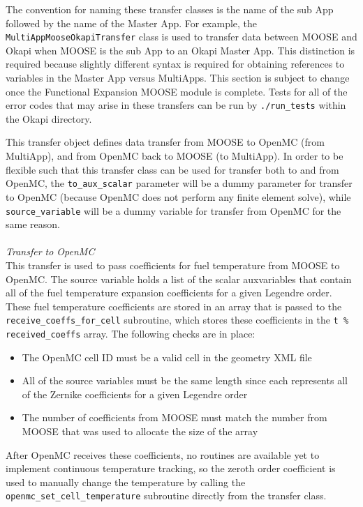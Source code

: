 \documentclass[10pt]{article}
\newcounter{subsubsubsection}[subsubsection]
\numberwithin{equation}{section} %
\begin{document}
The convention for naming these transfer classes is the name of the sub App followed by the name of the Master App. For example, the {\tt MultiAppMooseOkapiTransfer} class is used to transfer data between MOOSE and Okapi when MOOSE is the sub App to an Okapi Master App. This distinction is required because slightly different syntax is required for obtaining references to variables in the Master App versus MultiApps. This section is subject to change once the Functional Expansion MOOSE module is complete. Tests for all of the error codes that may arise in these transfers can be run by {\tt ./run\_tests} within the Okapi directory. 

This transfer object defines data transfer from MOOSE to OpenMC (from MultiApp), and from OpenMC back to MOOSE (to MultiApp). In order to be flexible such that this transfer class can be used for transfer both to and from OpenMC, the {\tt to\_aux\_scalar} parameter will be a dummy parameter for transfer to OpenMC (because OpenMC does not perform any finite element solve), while {\tt source\_variable} will be a dummy variable for transfer from OpenMC for the same reason.
\\\\
{\it Transfer to OpenMC}\\
This transfer is used to pass coefficients for fuel temperature from MOOSE to OpenMC. The source variable holds a list of the scalar auxvariables that contain all of the fuel temperature expansion coefficients for a given Legendre order. These fuel temperature coefficients are stored in an array that is passed to the {\tt receive\_coeffs\_for\_cell} subroutine, which stores these coefficients in the {\tt t \% received\_coeffs} array. The following checks are in place:

\begin{itemize}
\item The OpenMC cell ID must be a valid cell in the geometry XML file
\item All of the source variables must be the same length since each represents all of the Zernike coefficients for a given Legendre order
\item The number of coefficients from MOOSE must match the number from MOOSE that was used to allocate the size of the array
\end{itemize}

After OpenMC receives these coefficients, no routines are available yet to implement continuous temperature tracking, so the zeroth order coefficient is used to manually change the temperature by calling the {\tt openmc\_set\_cell\_temperature} subroutine directly from the transfer class.
\end{document}
